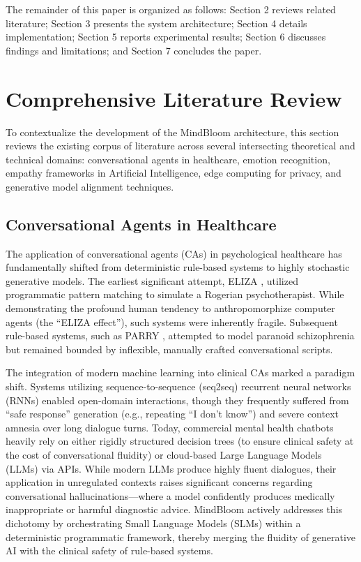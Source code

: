 \documentclass[12pt,twoside]{article}
\begin{document}
The remainder of this paper is organized as follows: Section 2 reviews related literature; Section 3 presents the system architecture; Section 4 details implementation; Section 5 reports experimental results; Section 6 discusses findings and limitations; and Section 7 concludes the paper.

\section{Comprehensive Literature Review}

To contextualize the development of the MindBloom architecture, this section reviews the existing corpus of literature across several intersecting theoretical and technical domains: conversational agents in healthcare, emotion recognition, empathy frameworks in Artificial Intelligence, edge computing for privacy, and generative model alignment techniques.

\subsection{Conversational Agents in Healthcare}

The application of conversational agents (CAs) in psychological healthcare has fundamentally shifted from deterministic rule-based systems to highly stochastic generative models. The earliest significant attempt, ELIZA \citep{weizenbaum1966eliza}, utilized programmatic pattern matching to simulate a Rogerian psychotherapist. While demonstrating the profound human tendency to anthropomorphize computer agents (the ``ELIZA effect''), such systems were inherently fragile. Subsequent rule-based systems, such as PARRY \citep{colby1971parry}, attempted to model paranoid schizophrenia but remained bounded by inflexible, manually crafted conversational scripts.

The integration of modern machine learning into clinical CAs marked a paradigm shift. Systems utilizing sequence-to-sequence (seq2seq) recurrent neural networks (RNNs) enabled open-domain interactions, though they frequently suffered from ``safe response'' generation (e.g., repeating ``I don't know'') and severe context amnesia over long dialogue turns. Today, commercial mental health chatbots heavily rely on either rigidly structured decision trees (to ensure clinical safety at the cost of conversational fluidity) or cloud-based Large Language Models (LLMs) via APIs. While modern LLMs produce highly fluent dialogues, their application in unregulated contexts raises significant concerns regarding conversational hallucinations---where a model confidently produces medically inappropriate or harmful diagnostic advice. MindBloom actively addresses this dichotomy by orchestrating Small Language Models (SLMs) within a deterministic programmatic framework, thereby merging the fluidity of generative AI with the clinical safety of rule-based systems.
\end{document}
